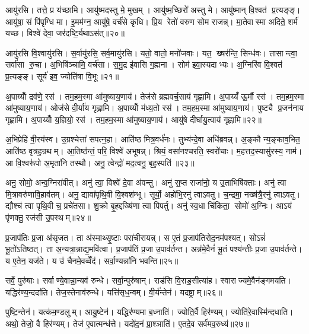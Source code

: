 आयु॑रसि। तत्ते॒ प्र य॑च्छामि। आयु॑ष्मदस्तु मे॒ मुखम्। आयु॑ष्म॒च्छिरो॑ अस्तु मे। आयु॑ष्मान् वि॒श्वत॑ प्र॒त्यङ्ङ्। आयु॑षा॒ सं पि॑पृग्धि मा। इ॒मम॑ग्न॒ आयु॑षे॒ वर्च॑से कृधि। प्रि॒य रेतो॑ वरुण सोम राजन्न्। मा॒तेवास्मा अदिते॒ शर्म॑ यच्छ। विश्वे॑ देवा॒ जर॑दष्टि॒र्यथाऽस॑त्॥२०॥

आयु॑रसि वि॒श्वायु॑रसि। स॒र्वायु॑रसि॒ सर्व॒मायु॑रसि। यतो॒ वातो॒ मनो॑जवाः। यत॒ ख्षर॑न्ति॒ सिन्ध॑वः। तासान्त्वा॒ सर्वा॑सा रु॒चा। अ॒भिषि॑ञ्चामि॒ वर्च॑सा। स॒मु॒द्र इ॑वासि ग॒ह्मना। सोम॑ इवा॒स्यदाभ्यः। अ॒ग्निरि॑व वि॒श्वत॑ प्र॒त्यङ्ङ्। सूर्य॑ इव॒ ज्योति॑षा वि॒भूः॥२१॥

अ॒पाय्योँ द्रव॑णे॒ रस॑। तम॒हम॒स्मा आ॑मुष्याय॒णाय॑। तेज॑से ब्रह्मवर्च॒साय॑ गृह्णामि। अ॒पाय्यँ ऊ॒र्मौ रस॑। तम॒हम॒स्मा आ॑मुष्याय॒णाय॑। ओज॑से वी॒र्या॑य गृह्णामि। अ॒पाय्योँ म॑ध्य॒तो रस॑। तम॒हम॒स्मा आ॑मुष्याय॒णाय॑। पुष्ट्यै प्र॒जन॑नाय गृह्णामि। अ॒पाय्योँ य॒ज्ञियो॒ रस॑। तम॒हम॒स्मा आ॑मुष्याय॒णाय॑। आयु॑षे दीर्घायु॒त्वाय॑ गृह्णामि॥२२॥\anuvakamend[गोष्वोज॑स्वन्त श्रीणा॒म्योजो॑ऽसि॒ तत्ते॒ प्रय॑च्छामि॒ पय॑सा॒ संपि॑पृग्धि॒ माऽस॑द्वि॒भूर्य॒ज्ञियो॒ रसो॒ द्वे च॑]

अ॒भिप्रेहि॑ वी॒रय॑स्व। उ॒ग्रश्चेत्ता॑ सपत्न॒हा। आति॑ष्ठ मित्र॒वर्ध॑नः। तुभ्य॑न्दे॒वा अधि॑ब्रवन्न्। अ॒ङ्कौ न्य॒ङ्काव॒भित॒ आति॑ष्ठ वृत्रह॒न्रथम्। आ॒तिष्ठ॑न्तं॒ परि॒ विश्वे॑ अभूषन्न्। श्रियं॒ वसा॑नश्चरति॒ स्वरो॑चाः। म॒हत्तद॒स्यासु॑रस्य॒ नाम॑। आ वि॒श्वरू॑पो अ॒मृता॑नि तस्थौ। अनु॒ त्वेन्द्रो॑ मद॒त्वनु॒ बृह॒स्पति॑॥२३॥

अनु॒ सोमो॒ अन्व॒ग्निरा॑वीत्। अनु॑ त्वा॒ विश्वे॑ दे॒वा अ॑वन्तु। अनु॑ स॒प्त राजा॑नो॒ य उ॒ताभिषि॑क्ताः। अनु॑ त्वा मि॒त्रावरु॑णावि॒हाव॑तम्। अनु॒ द्यावा॑पृथि॒वी वि॒श्वश॑म्भू। सूर्यो॒ अहो॑भि॒रनु॑ त्वाऽवतु। च॒न्द्रमा॒ नख्ष॑त्रै॒रनु॑ त्वाऽवतु। द्यौश्च॑ त्वा पृथि॒वी च॒ प्रचे॑तसा। शु॒क्रो बृ॒हद्दख्षि॑णा त्वा पिपर्तु। अनु॑ स्व॒धा चि॑किता॒ सोमो॑ अ॒ग्निः। आऽयं पृ॑णक्तु॒ रज॑सी उ॒पस्थम्॥२४॥\anuvakamend[बृह॒स्पति॒ सोमो॑ अ॒ग्निरेक॑ञ्च]

प्र॒जाप॑तिः प्र॒जा अ॑सृजत। ता अ॑स्माथ्सृ॒ष्टाः परा॑चीरायन्न्। स ए॒तं प्र॒जाप॑तिरोद॒नम॑पश्यत्। सोऽन्नं॑ भू॒तो॑ऽतिष्ठत्। ता अ॒न्यत्रा॒न्नाद्य॒मवि॑त्वा। प्र॒जाप॑तिं प्र॒जा उ॒पाव॑र्तन्त। अन्न॑मे॒वैनं॑ भू॒तं पश्य॑न्तीः प्र॒जा उ॒पाव॑र्तन्ते। य ए॒तेन॒ यज॑ते। य उ॑ चैनमे॒वव्वेँद॑। सर्वा॒ण्यन्ना॑नि भवन्ति॥२५॥

सर्वे॒ पुरु॑षाः। सर्वाण्ये॒वान्ना॒न्यव॑ रुन्धे। सर्वा॒न्पुरु॑षान्। राड॑सि वि॒राड॒सीत्या॑ह। स्वाराज्यमे॒वैन॑ङ्गमयति। यद्धिर॑ण्य॒न्ददा॑ति। तेज॒स्तेनाव॑रुन्धे। यत्ति॑सृध॒न्वम्। वी॒र्य॑न्तेन॑। यदष्ट्राम्॥२६॥

पुष्टि॒न्तेन॑। यत्क॑म॒ण्डलुम्। आयु॒ष्टेन॑। यद्धिर॑ण्यमा ब॒ध्नाति॑। ज्योति॒र्वै हिर॑ण्यम्। ज्योति॑रे॒वास्मि॑न्दधाति। अथो॒ तेजो॒ वै हिर॑ण्यम्। तेज॑ ए॒वात्मन्ध॑त्ते। यदो॑द॒नं प्रा॒श्ञाति॑। ए॒तदे॒व सर्व॑मव॒रुध्य॑॥२७॥

